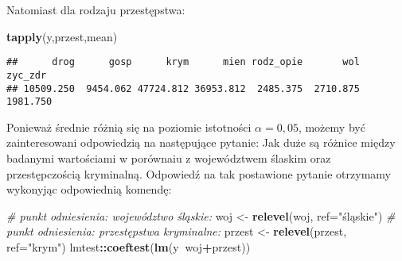 \documentclass[polish,]{book}
\newenvironment{Shaded}{\begin{snugshade}}{\end{snugshade}}
\newcommand{\CommentTok}[1]{\textcolor[rgb]{0.56,0.35,0.01}{\textit{#1}}}
\newcommand{\DataTypeTok}[1]{\textcolor[rgb]{0.13,0.29,0.53}{#1}}
\newcommand{\KeywordTok}[1]{\textcolor[rgb]{0.13,0.29,0.53}{\textbf{#1}}}
\newcommand{\NormalTok}[1]{#1}
\newcommand{\OperatorTok}[1]{\textcolor[rgb]{0.81,0.36,0.00}{\textbf{#1}}}
\newcommand{\StringTok}[1]{\textcolor[rgb]{0.31,0.60,0.02}{#1}}
\begin{document}
Natomiast dla rodzaju przestępstwa:

\begin{Shaded}
\begin{Highlighting}[]
\KeywordTok{tapply}\NormalTok{(y,przest,mean)}
\end{Highlighting}
\end{Shaded}

\begin{verbatim}
##      drog      gosp      krym      mien rodz_opie       wol   zyc_zdr 
## 10509.250  9454.062 47724.812 36953.812  2485.375  2710.875  1981.750
\end{verbatim}

Ponieważ średnie różnią się na poziomie istotności \(\alpha = 0,05\), możemy być zainteresowani odpowiedzią na następujące pytanie: Jak duże są różnice między badanymi wartościami w porównaiu z województwem ślaskim oraz przestępczością kryminalną. Odpowiedź na tak postawione pytanie otrzymamy wykonyjąc odpowiednią komendę:

\begin{Shaded}
\begin{Highlighting}[]
\CommentTok{# punkt odniesienia: województwo śląskie:}
\NormalTok{woj <-}\StringTok{ }\KeywordTok{relevel}\NormalTok{(woj, }\DataTypeTok{ref=}\StringTok{"śląskie"}\NormalTok{)}
\CommentTok{# punkt odniesienia: przestępstwa kryminalne:}
\NormalTok{przest <-}\StringTok{ }\KeywordTok{relevel}\NormalTok{(przest, }\DataTypeTok{ref=}\StringTok{"krym"}\NormalTok{)}
\NormalTok{lmtest}\OperatorTok{::}\KeywordTok{coeftest}\NormalTok{(}\KeywordTok{lm}\NormalTok{(y}\OperatorTok{~}\NormalTok{woj}\OperatorTok{+}\NormalTok{przest))}
\end{Highlighting}
\end{Shaded}
\end{document}
